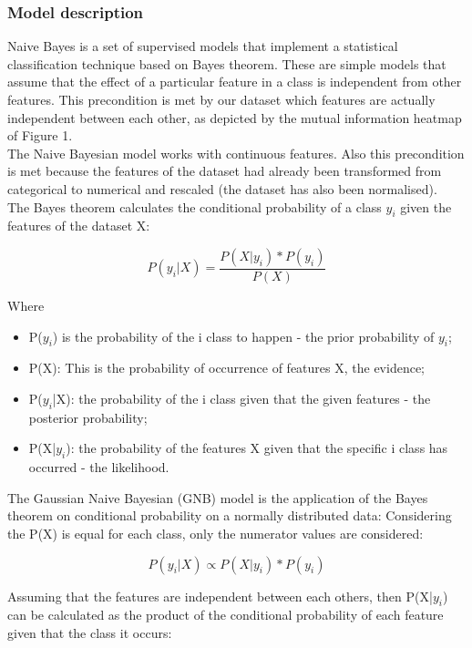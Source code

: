 \documentclass[11pt,a4paper]{article}
\begin{document}
\subsubsection{Model description} 
Naive Bayes is a set of supervised models that implement a statistical classification technique based on Bayes theorem. These are simple models that assume that the effect of a particular feature in a class is independent from other features. This precondition is met by our dataset which features are actually independent between each other, as depicted by the mutual information heatmap of Figure 1.\\
The Naive Bayesian model works with continuous features. Also this precondition is met because the features of the dataset had already been transformed from categorical to numerical and rescaled (the dataset has also been normalised).\\
The Bayes theorem calculates the conditional probability of a class $y_i$ given the features of the dataset X: 

\begin{displaymath}
P(y_i|X) = \frac{P(X|y_i) * P(y_i)}{P(X)}
\end{displaymath}

Where
\begin{itemize}
\item P($y_i$) is the probability of the i class to happen - the prior probability of $y_i$;
\item P(X): This is the probability of occurrence of features X, the evidence;
\item P($y_i$|X): the probability of the i class given that the given features - the posterior probability;
\item P(X|$y_i$): the probability of the features X given that the specific i class has occurred - the likelihood.
\end{itemize}
The Gaussian Naive Bayesian (GNB) model is the application of the Bayes theorem on conditional probability on a normally distributed data:
Considering the P(X) is equal for each class, only the numerator values are considered:

\begin{displaymath}
P(y_i|X) ∝ P(X|y_i) * P(y_i)
\end{displaymath}

Assuming that the features are independent between each others, then P(X|$y_i$) can be calculated as the product of the conditional probability of each feature given that the class it occurs:
\end{document}

